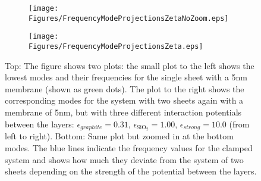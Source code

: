 \begin{figure}[H]
\centering
\begin{subfigure}{0.7\textwidth}
  \centering
  \vspace{-0.8em}
  \texttt{[image: Figures/FrequencyModeProjectionsZetaNoZoom.eps]}
  \label{interpota}
  \vspace{-3.8em}
\end{subfigure}\vspace{1mm}
\begin{subfigure}{\textwidth}
  \centering
  \texttt{[image: Figures/FrequencyModeProjectionsZeta.eps]}
  \label{interpotb}
\end{subfigure}
\vspace{-4em}
\caption{Top: The figure shows two plots: the small plot to the left shows the lowest modes and their frequencies for the single sheet with a 5nm membrane (shown as green dots).  The plot to the right shows the corresponding modes for the system with two sheets again with a membrane of 5nm, but with three different interaction potentials between the layers: $\epsilon_{graphite}=0.31$, $\epsilon_{\text{SiO}_{2}}=1.00$, $\epsilon_{strong}=10.0$ (from left to right). Bottom: Same plot but zoomed in at the bottom modes. The blue lines indicate the frequency values for the clamped system and shows how much they deviate from the system of two sheets depending on the strength of the potential between the layers.}
\label{interpot}
\end{figure}
\twocolumngrid

